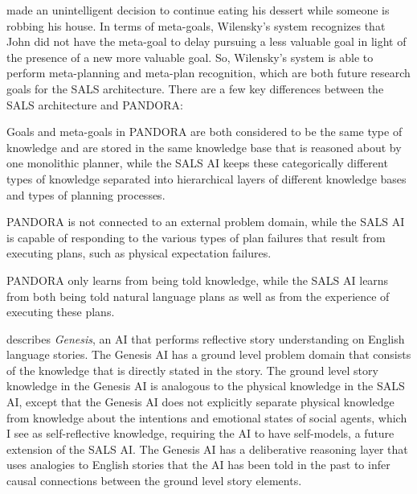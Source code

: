 made an unintelligent decision to continue eating his dessert while
someone is robbing his house.  In terms of meta-goals, Wilensky's
system recognizes that John did not have the meta-goal to delay
pursuing a less valuable goal in light of the presence of a new more
valuable goal.  So, Wilensky's system is able to perform meta-planning
and meta-plan recognition, which are both future research goals for
the SALS architecture.  There are a few key differences between the
SALS architecture and PANDORA:
\begin{packed_enumerate}
\item{Goals and meta-goals in PANDORA are both considered to be the
  same type of knowledge and are stored in the same knowledge base
  that is reasoned about by one monolithic planner, while the SALS AI
  keeps these categorically different types of knowledge separated
  into hierarchical layers of different knowledge bases and types of
  planning processes.}
\item{PANDORA is not connected to an external problem domain, while
  the SALS AI is capable of responding to the various types of plan
  failures that result from executing plans, such as physical
  expectation failures.}
\item{PANDORA only learns from being told knowledge, while the SALS AI
  learns from both being told natural language plans as well as from
  the experience of executing these plans.}
\end{packed_enumerate}

\cite{winston:2011} describes {\emph{Genesis}}, an AI that performs
reflective story understanding on English language stories.  The
Genesis AI has a ground level problem domain that consists of the
knowledge that is directly stated in the story.  The ground level
story knowledge in the Genesis AI is analogous to the physical
knowledge in the SALS AI, except that the Genesis AI does not
explicitly separate physical knowledge from knowledge about the
intentions and emotional states of social agents, which I see as
self-reflective knowledge, requiring the AI to have self-models, a
future extension of the SALS AI.  The Genesis AI has a deliberative
reasoning layer that uses analogies to English stories that the AI has
been told in the past to infer causal connections between the ground
level story elements.

